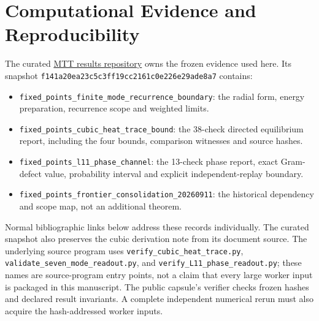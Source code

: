 \documentclass[11pt]{article}
\newcommand{\src}{https://github.com/PeterNero/mtt-results-repro}
\begin{document}
\section*{Computational Evidence and Reproducibility}
The curated \href{\src}{MTT results repository} owns the frozen evidence
used here. Its snapshot
\texttt{f141a20ea23c5c3ff19cc2161c0e226e29ade8a7} contains:
\begin{itemize}
\item \texttt{fixed\_points\_finite\_mode\_recurrence\_boundary}:
  the radial form, energy preparation, recurrence scope and weighted limits.
\item \texttt{fixed\_points\_cubic\_heat\_trace\_bound}:
  the 38-check directed equilibrium report, including the four bounds,
  comparison witnesses and source hashes.
\item \texttt{fixed\_points\_l11\_phase\_channel}:
  the 13-check phase report, exact Gram-defect value, probability interval
  and explicit independent-replay boundary.
\item \texttt{fixed\_points\_frontier\_consolidation\_20260911}:
  the historical dependency and scope map, not an additional theorem.
\end{itemize}
Normal bibliographic links below address these records individually.
The curated snapshot also preserves the cubic derivation note from its
document source. The underlying source program uses
\texttt{verify\_cubic\_heat\_trace.py},
\texttt{validate\_seven\_mode\_readout.py}, and
\texttt{verify\_L11\_phase\_readout.py}; these names are source-program
entry points, not a claim that every large worker input is packaged in
this manuscript. The public capsule's verifier checks frozen hashes and
declared result invariants. A complete independent numerical rerun must
also acquire the hash-addressed worker inputs.



\end{document}
